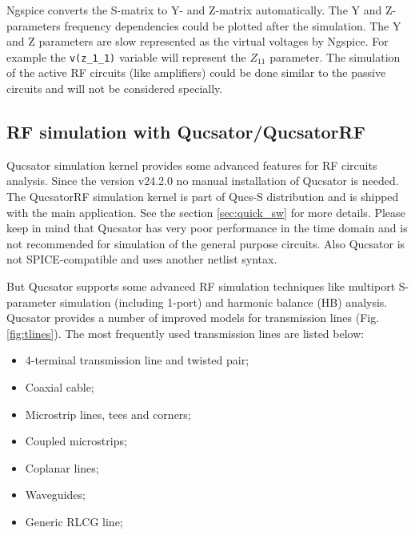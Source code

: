 \documentclass[a4paper,12pt]{article}
\begin{document}
Ngspice converts the S-matrix to Y- and Z-matrix automatically. The Y and Z-parameters frequency dependencies could be plotted after the simulation. The Y and Z parameters are slow represented as the virtual voltages by Ngspice. For example the \verb|v(z_1_1)| variable will represent the $Z_{11}$ parameter. The simulation of the active RF circuits (like amplifiers) could be done similar to the passive circuits and will not be considered specially.     

\subsection{RF simulation with Qucsator/QucsatorRF}

Qucsator simulation kernel provides some advanced features for RF circuits analysis. Since the version v24.2.0 no manual installation of Qucsator is needed. The QucsatorRF simulation kernel is part of Qucs-S distribution and is shipped with the main application. See the section \ref{sec:quick_sw} for more details. Please keep in mind that Qucsator has very poor performance in the time domain and is not recommended for simulation of the general purpose circuits. Also Qucsator is not SPICE-compatible and uses another netlist syntax.

But Qucsator supports some advanced RF simulation techniques like multiport S-parameter simulation (including 1-port) and harmonic balance (HB) analysis. Qucsator provides a number of improved models for transmission lines (Fig. \ref{fig:tlines}). The most frequently used transmission lines are listed below: 

\begin{itemize}
 \item 4-terminal transmission line and twisted pair;
 \item Coaxial cable;
 \item Microstrip lines, tees and corners;
 \item Coupled microstrips;
 \item Coplanar lines;
 \item Waveguides;
 \item Generic RLCG line;
\end{itemize}
\end{document}
